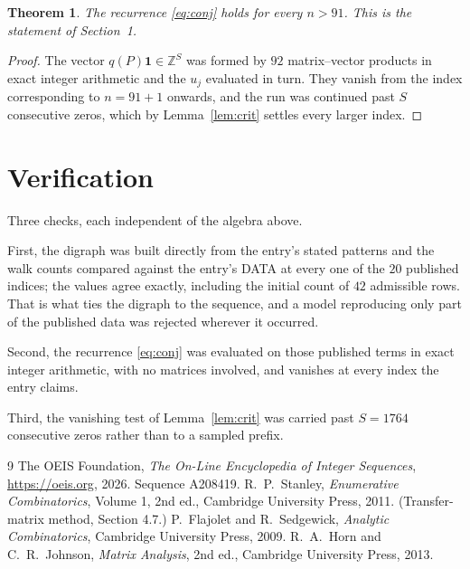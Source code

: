 \documentclass[11pt,a4paper]{article}
\theoremstyle{plain}
\newtheorem{theorem}{Theorem}
\theoremstyle{definition}
\begin{document}
\begin{theorem}
The recurrence \eqref{eq:conj} holds for every $n>91$. This is the statement of
Section~1.
\end{theorem}

\begin{proof}
The vector $q(P)\mathbf{1}\in\mathbb{Z}^{S}$ was formed by $92$ matrix--vector
products in exact integer arithmetic and the $u_j$ evaluated in turn. They vanish from the
index corresponding to $n=91+1$ onwards, and the run was continued past $S$ consecutive
zeros, which by Lemma~\ref{lem:crit} settles every larger index.
\end{proof}

\section{Verification}

Three checks, each independent of the algebra above.

First, the digraph was built directly from the entry's stated patterns and the walk counts
compared against the entry's DATA at every one of the $20$ published indices; the
values agree exactly, including the initial count of $42$ admissible rows. That is
what ties the digraph to the sequence, and a model reproducing only part of the published
data was rejected wherever it occurred.

Second, the recurrence \eqref{eq:conj} was evaluated on those published terms in exact
integer arithmetic, with no matrices involved, and vanishes at every index the entry claims.

Third, the vanishing test of Lemma~\ref{lem:crit} was carried past $S=1764$ consecutive
zeros rather than to a sampled prefix.

\begin{thebibliography}{9}
 The OEIS Foundation, \emph{The On-Line Encyclopedia of Integer
Sequences}, \url{https://oeis.org}, 2026. Sequence A208419.
 R.~P.~Stanley, \emph{Enumerative Combinatorics}, Volume 1, 2nd ed.,
Cambridge University Press, 2011. (Transfer-matrix method, Section 4.7.)
 P.~Flajolet and R.~Sedgewick, \emph{Analytic Combinatorics}, Cambridge
University Press, 2009.
 R.~A.~Horn and C.~R.~Johnson, \emph{Matrix Analysis}, 2nd ed., Cambridge
University Press, 2013.
\end{thebibliography}
\end{document}
